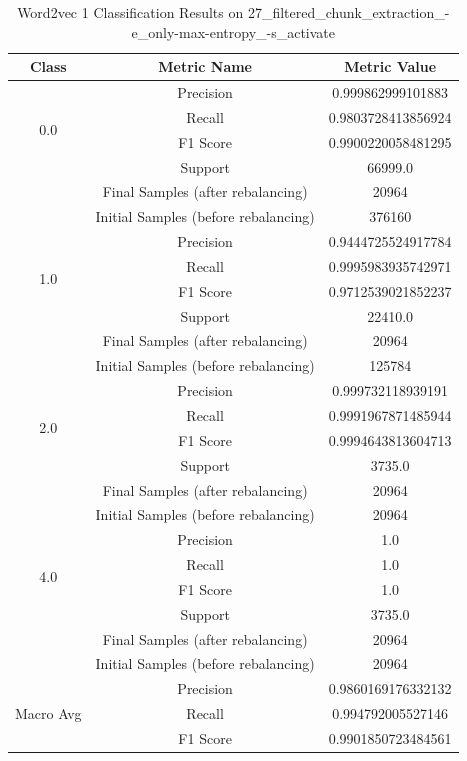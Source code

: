 \begin{longtable}{|c|c|c|}
\caption{Word2vec 1 Classification Results on 27\_filtered\_chunk\_extraction\_-e\_only-max-entropy\_-s\_activate} \label{tab:27_filtered_chunk_extraction_-e_only-max-entropy_-s_activate_word2vec_1_classifiers_results} \\
\hline
Class & Metric Name & Metric Value \\
\hline
\multirow{4}{*}{0.0} & Precision & 0.999862999101883 \\
 & Recall & 0.9803728413856924 \\
 & F1 Score & 0.9900220058481295 \\
 & Support & 66999.0 \\
 & Final Samples (after rebalancing) & 20964 \\
 & Initial Samples (before rebalancing) & 376160 \\
\hline
\multirow{4}{*}{1.0} & Precision & 0.9444725524917784 \\
 & Recall & 0.9995983935742971 \\
 & F1 Score & 0.9712539021852237 \\
 & Support & 22410.0 \\
 & Final Samples (after rebalancing) & 20964 \\
 & Initial Samples (before rebalancing) & 125784 \\
\hline
\multirow{4}{*}{2.0} & Precision & 0.999732118939191 \\
 & Recall & 0.9991967871485944 \\
 & F1 Score & 0.9994643813604713 \\
 & Support & 3735.0 \\
 & Final Samples (after rebalancing) & 20964 \\
 & Initial Samples (before rebalancing) & 20964 \\
\hline
\multirow{4}{*}{4.0} & Precision & 1.0 \\
 & Recall & 1.0 \\
 & F1 Score & 1.0 \\
 & Support & 3735.0 \\
 & Final Samples (after rebalancing) & 20964 \\
 & Initial Samples (before rebalancing) & 20964 \\
\hline
\multirow{4}{*}{Macro Avg} & Precision & 0.9860169176332132 \\
 & Recall & 0.994792005527146 \\
 & F1 Score & 0.9901850723484561 \\

\end{longtable}
